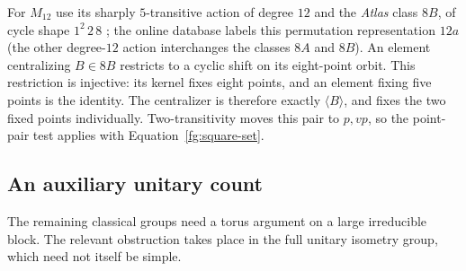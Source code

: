 For $M_{12}$ use its sharply $5$-transitive action of degree $12$ and
the \emph{Atlas} class $8B$, of cycle shape $1^2\,2\,8$
\cite{Atlas,AtlasOnline}; the online database labels this permutation
representation $12a$ (the other degree-$12$ action interchanges the
classes $8A$ and $8B$).
An element centralizing $B\in8B$ restricts to a cyclic shift on its
eight-point orbit. This restriction is injective: its kernel fixes
eight points, and an element fixing five points is the identity.
The centralizer is therefore exactly $\langle B\rangle$, and fixes
the two fixed points individually. Two-transitivity moves this pair to
$p,vp$, so the point-pair test applies with
Equation~\eqref{fg:square-set}.

\subsection{An auxiliary unitary count}

The remaining classical groups need a torus argument on a large
irreducible block. The relevant obstruction takes place in the full
unitary isometry group, which need not itself be simple.

